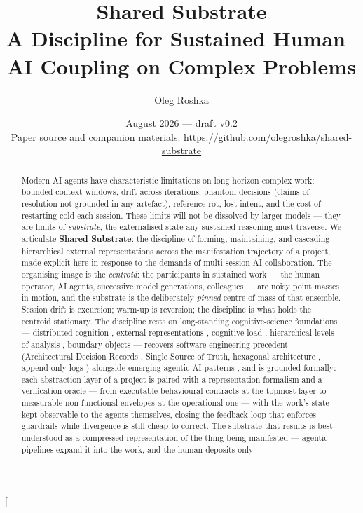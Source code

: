 \documentclass[11pt,a4paper,twocolumn]{article}
\title{\textbf{Shared Substrate}\\[2pt]
{\large A Discipline for Sustained Human--AI Coupling on Complex Problems}}
\author{Oleg Roshka}
\date{August 2026 --- draft v0.2\\[3pt]
{\small Paper source and companion materials:
\url{https://github.com/olegroshka/shared-substrate}}}
\begin{document}
\twocolumn[
\begin{@twocolumnfalse}
\maketitle
\begin{abstract}
\noindent
Modern AI agents have characteristic limitations on long-horizon
complex work: bounded context windows, drift across iterations,
phantom decisions (claims of resolution not grounded in any
artefact), reference rot, lost intent, and the cost of restarting
cold each session. These limits will not be dissolved by larger
models --- they are limits of \emph{substrate}, the externalised
state any sustained reasoning must traverse. We articulate
\textbf{Shared Substrate}: the discipline of forming,
maintaining, and cascading hierarchical external representations
across the manifestation trajectory of a project, made explicit
here in response to the demands of multi-session AI
collaboration. The organising image is the
\emph{centroid}: the participants in sustained work --- the human
operator, AI agents, successive model generations, colleagues ---
are noisy point masses in motion, and the substrate is the
deliberately \emph{pinned} centre of mass of that ensemble.
Session drift is excursion; warm-up is reversion; the discipline
is what holds the centroid stationary. The discipline rests on
long-standing cognitive-science foundations --- distributed
cognition \citep{hutchins1995}, external representations
\citep{scaife1996external}, cognitive load
\citep{sweller1988cognitive}, hierarchical levels of analysis
\citep{marr1982vision}, boundary objects \citep{star1989boundary}
--- recovers software-engineering precedent (Architectural
Decision Records \citep{nygard2011adr}, Single Source of Truth,
hexagonal architecture \citep{cockburn2005hexagonal}, append-only
logs \citep{candea2003crashonly}) alongside emerging agentic-AI
patterns \citep{lewis2020rag, packer2024memgpt, shinn2023reflexion,
bai2022constitutional}, and is grounded formally: each abstraction
layer of a project is paired with a representation formalism and a
verification oracle --- from executable behavioural contracts at
the topmost layer to measurable non-functional envelopes at the
operational one --- with the work's state kept observable to the
agents themselves, closing the feedback loop that enforces
guardrails while divergence is still cheap to correct. The
substrate that results is best understood as a compressed
representation of the thing being manifested --- agentic
pipelines expand it into the work, and the human deposits only

\end{abstract}
\end{@twocolumnfalse}
\end{document}
